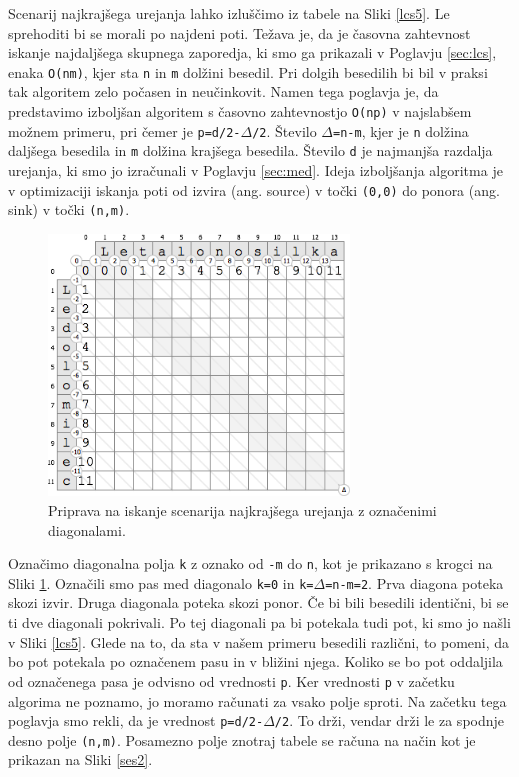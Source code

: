 \documentclass[a4paper, 12pt, twoside]{book}
\begin{document}
Scenarij najkrajšega urejanja lahko izluščimo iz tabele na Sliki \ref{lcs5}. Le sprehoditi bi se morali po najdeni poti. Težava je, da je časovna zahtevnost iskanje najdaljšega skupnega zaporedja, ki smo ga prikazali v Poglavju \ref{sec:lcs}, enaka {\tt O(nm)}, kjer sta {\tt n} in {\tt m} dolžini besedil. Pri dolgih besedilih bi bil v praksi tak algoritem zelo počasen in neučinkovit. Namen tega poglavja je, da predstavimo izboljšan algoritem \cite{o-np} s časovno zahtevnostjo {\tt O(np)} v najslabšem možnem primeru, pri čemer je {\tt p=d/2-$\Delta$/2}. Število {\tt $\Delta$=n-m}, kjer je {\tt n} dolžina daljšega besedila in {\tt m} dolžina krajšega besedila. Število {\tt d} je najmanjša razdalja urejanja, ki smo jo izračunali v Poglavju \ref{sec:med}. Ideja izboljšanja algoritma je v optimizaciji iskanja poti od izvira (ang. source) v točki {\tt (0,0)} do ponora (ang. sink) v točki {\tt (n,m)}.

\begin{figure}[placement h]
\begin{center}
\includegraphics[width=8cm]{ses1.png}
\end{center}
\caption{Priprava na iskanje scenarija najkrajšega urejanja z označenimi diagonalami.}
\label{ses1}
\end{figure}

Označimo diagonalna polja {\tt k} z oznako od {\tt -m} do {\tt n}, kot je prikazano s krogci na Sliki \ref{ses1}. Označili smo pas med diagonalo {\tt k=0} in {\tt k=$\Delta$=n-m=2}. Prva diagona poteka skozi izvir. Druga diagonala poteka skozi ponor. Če bi bili besedili identični, bi se ti dve diagonali pokrivali. Po tej diagonali pa bi potekala tudi pot, ki smo jo našli v Sliki \ref{lcs5}. Glede na to, da sta v našem primeru besedili različni, to pomeni, da bo pot potekala po označenem pasu in v bližini njega. Koliko se bo pot oddaljila od označenega pasa je odvisno od vrednosti {\tt p}. Ker vrednosti {\tt p} v začetku algorima ne poznamo, jo moramo računati za vsako polje sproti. Na začetku tega poglavja smo rekli, da je vrednost {\tt p=d/2-$\Delta$/2}. To drži, vendar drži le za spodnje desno polje {\tt (n,m)}. Posamezno polje znotraj tabele se računa na način kot je prikazan na Sliki \ref{ses2}.
\end{document}

